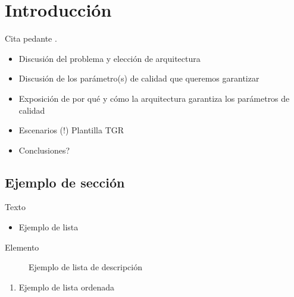 \chapter{Introducción}

Cita pedante \cite{google01}.

\begin{itemize}
 \item Discusión del problema y elección de arquitectura
 \item Discusión de los parámetro(s) de calidad que queremos garantizar
 \item Exposición de por qué y cómo la arquitectura garantiza los parámetros de calidad
 \item Escenarios (!) Plantilla TGR
 \item Conclusiones?
\end{itemize}

\section{Ejemplo de sección}

Texto

\begin{itemize}
 \item Ejemplo de lista
\end{itemize}

\begin{description}
 \item[Elemento] Ejemplo de lista de descripción
\end{description}

\begin{enumerate}
 \item Ejemplo de lista ordenada
\end{enumerate}
